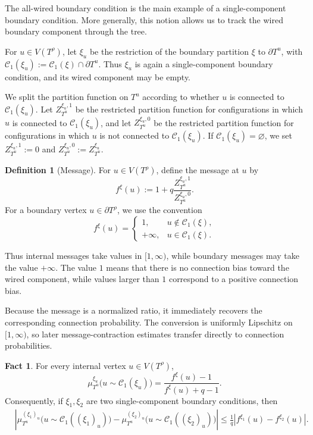 \documentclass[11pt]{amsart}
\theoremstyle{plain}
\theoremstyle{definition}
\newtheorem{definition}[theorem]{Definition}
\newtheorem{fact}[theorem]{Fact}
\theoremstyle{remark}
\begin{document}
The all-wired boundary condition is the main example of a single-component boundary condition. More generally, this notion allows us to track the wired boundary component through the tree.

For $u\in V(T^\rho)$, let $\xi_u$ be the restriction of the boundary partition $\xi$ to $\partial T^u$, with $\mathcal C_1(\xi_u):=\mathcal C_1(\xi)\cap\partial T^u$. Thus $\xi_u$ is again a single-component boundary condition, and its wired component may be empty.

We split the partition function on $T^u$ according to whether $u$ is connected to $\mathcal C_1(\xi_u)$. Let $Z_{T^u}^{\xi_u,1}$ be the restricted partition function for configurations in which $u$ is connected to $\mathcal C_1(\xi_u)$, and let $Z_{T^u}^{\xi_u,0}$ be the restricted partition function for configurations in which $u$ is not connected to $\mathcal C_1(\xi_u)$. If $\mathcal C_1(\xi_u)=\varnothing$, we set $Z_{T^u}^{\xi_u,1}:=0$ and $Z_{T^u}^{\xi_u,0}:=Z_{T^u}^{\xi_u}$.

\begin{definition}[Message]
\label{def:message}
For $u\in V(T^\rho)$, define the message at $u$ by
\[
    f^{\xi}(u)
    :=
    1+
    q
    \frac{
        Z_{T^u}^{\xi_u,1}
    }{
        Z_{T^u}^{\xi_u,0}
    }.
\]
For a boundary vertex $u\in \partial T^\rho$, we use the convention
\[
    f^{\xi}(u)
    =
    \begin{cases}
    1, & u\notin \mathcal C_1(\xi),\\
    +\infty, & u\in \mathcal C_1(\xi).
    \end{cases}
\]
\end{definition}

Thus internal messages take values in $[1,\infty)$, while boundary messages may take the value $+\infty$. The value $1$ means that there is no connection bias toward the wired component, while values larger than $1$ correspond to a positive connection bias.

Because the message is a normalized ratio, it immediately recovers the corresponding connection probability.  The conversion is uniformly Lipschitz on $[1,\infty)$, so later message-contraction estimates transfer directly to connection probabilities.

\begin{fact}
\label{fact:message-probability}
For every internal vertex $u\in V(T^\rho)$,
\[
    \mu_{T^u}^{\xi_u}
    \bigl(u\sim \mathcal C_1(\xi_u)\bigr)
    =
    \frac{
        f^{\xi}(u)-1
    }{
        f^{\xi}(u)+q-1
    }.
\]
Consequently, if $\xi_1,\xi_2$ are two single-component boundary conditions, then
\[
\begin{aligned}
&
\left|
    \mu_{T^u}^{(\xi_1)_u}
    \bigl(u\sim \mathcal C_1((\xi_1)_u)\bigr)
    -
    \mu_{T^u}^{(\xi_2)_u}
    \bigl(u\sim \mathcal C_1((\xi_2)_u)\bigr)
\right|
\le
\frac{1}{q}
\left|
    f^{\xi_1}(u)
    -
    f^{\xi_2}(u)
\right|.
\end{aligned}
\]
\end{fact}
\end{document}
